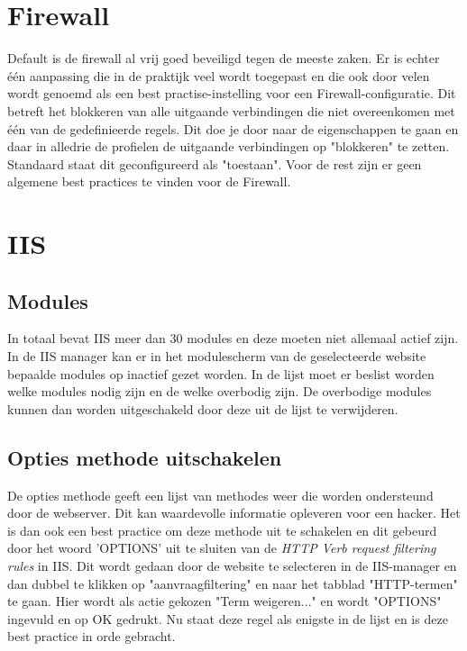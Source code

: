 \documentclass[pdftex,a4paper,12pt]{report}
\begin{document}
\section{Firewall}
Default is de firewall al vrij goed beveiligd tegen de meeste zaken. Er is echter één aanpassing die in de praktijk veel wordt toegepast en die ook door velen wordt genoemd als een best practise-instelling voor een Firewall-configuratie. Dit betreft het blokkeren van alle uitgaande verbindingen die niet overeenkomen met één van de gedefinieerde regels. Dit doe je door naar de eigenschappen te gaan en daar in alledrie de profielen de uitgaande verbindingen op "blokkeren" te zetten. Standaard staat dit geconfigureerd als "toestaan". Voor de rest zijn er geen algemene best practices te vinden voor de Firewall.

\section{IIS}
\subsection{Modules}
In totaal bevat IIS meer dan 30 modules en deze moeten niet allemaal actief zijn. In de IIS manager kan er in het modulescherm van de geselecteerde website bepaalde modules op inactief gezet worden. In de lijst moet er beslist worden welke modules nodig zijn en de welke overbodig zijn. De overbodige modules kunnen dan worden uitgeschakeld door deze uit de lijst te verwijderen. 

\subsection{Opties methode uitschakelen}
De opties methode geeft een lijst van methodes weer die worden ondersteund door de webserver. Dit kan waardevolle informatie opleveren voor een hacker. Het is dan ook een best practice om deze methode uit te schakelen en dit gebeurd door het woord 'OPTIONS' uit te sluiten van de \textit{HTTP Verb request filtering rules} in IIS. Dit wordt gedaan door de website te selecteren in de IIS-manager en dan dubbel te klikken op "aanvraagfiltering" en naar het tabblad "HTTP-termen" te gaan. Hier wordt als actie gekozen "Term weigeren..." en wordt "OPTIONS" ingevuld en op OK gedrukt. Nu staat deze regel als enigste in de lijst en is deze best practice in orde gebracht.
\end{document}
